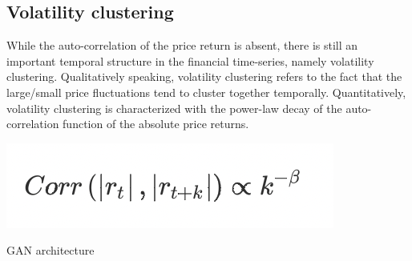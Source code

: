 \documentclass{article}
\begin{document}
\begin{multicols}{2}
    \subsection*{Volatility clustering}
    While the auto-correlation of the price return is absent, there is still an important temporal structure in the financial time-series, namely volatility clustering. Qualitatively speaking, volatility clustering refers to the fact that the large/small price fluctuations tend to cluster together temporally. Quantitatively, volatility clustering is characterized with the power-law decay of the auto-correlation function of the absolute price returns. 
    \begin{center}
        \includegraphics[scale = 0.8]{imgs/elisa/cl.jpg} 
    \end{center}

\end{multicols}
\newpage
\begin{center}
    {\huge{GAN architecture}}
\end{center}  
\end{document}
